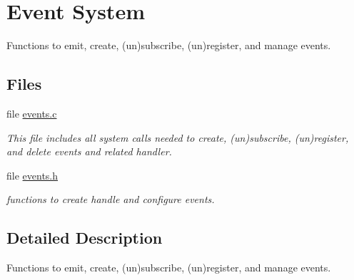 \hypertarget{group__events}{}\section{Event System}
\label{group__events}


Functions to emit, create, (un)subscribe, (un)register, and manage events.  


\subsection*{Files}
\begin{DoxyCompactItemize}
\item 
file \hyperlink{events_8c}{events.\+c}
\begin{DoxyCompactList}\small\item\em This file includes all system calls needed to create, (un)subscribe, (un)register, and delete events and related handler. \end{DoxyCompactList}\item 
file \hyperlink{events_8h}{events.\+h}
\begin{DoxyCompactList}\small\item\em functions to create handle and configure events. \end{DoxyCompactList}\end{DoxyCompactItemize}


\subsection{Detailed Description}
Functions to emit, create, (un)subscribe, (un)register, and manage events. 

